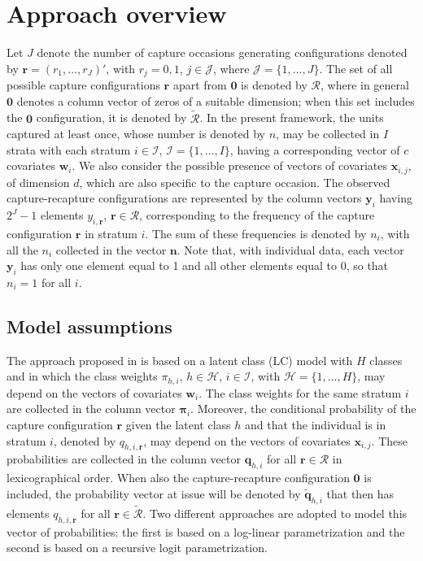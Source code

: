 \section{Approach overview}
%
Let $J$ denote the number of capture occasions generating configurations denoted by $\bm{r}=(r_1,\ldots,r_J)'$, with $r_j=0,1$, $j\in\mathcal{J}$, where $\mathcal{J}=\{1,\ldots,J\}$.
The set of all possible capture configurations $\bm{r}$ apart from $\bm{0}$ is denoted by $\mathcal{R}$, where in general $\bm{0}$ denotes a column vector of zeros of a suitable dimension; when this set includes the $\bm{0}$ configuration, it is denoted by $\tilde{\mathcal{R}}$.
In the present framework, the units captured at least once, whose number is denoted by $n$, may be collected in $I$ strata with each stratum $i\in\mathcal{I}$, $\mathcal{I}=\{1,\ldots,I\}$, having a corresponding vector of $c$ covariates $\bm{w}_i$.
We also consider the possible presence of vectors of covariates $\bm{x}_{i,j}$, of dimension $d$, which are also specific to the capture occasion.
The observed capture-recapture configurations are represented by the column vectors $\bm{y}_i$ having $2^J-1$ elements $y_{i,\bm{r}}$, $\bm{r}\in\mathcal{R}$, corresponding to the frequency of the capture configuration $\bm{r}$ in stratum $i$.
The sum of these frequencies is denoted by $n_i$, with all the $n_i$ collected in the vector $\bm{n}$.
Note that, with individual data, each vector $\bm{y}_i$ has only one element equal to 1 and all other elements equal to 0, so that $n_i=1$ for all $i$.
%
\subsection{Model assumptions}\label{sec:model_assumptions}
%
The approach proposed in \cite{bartolucci2024estimating} is based on a latent class (LC) model with $H$ classes and in which the class weights $\pi_{h,i}$, $h\in\mathcal{H}$, $i\in\mathcal{I}$, with $\mathcal{H}=\{1,\ldots,H\}$, may depend on the vectors of covariates $\bm{w}_i$.
The class weights for the same stratum $i$ are collected in the column vector $\bm\pi_i$.
Moreover, the conditional probability of the capture configuration $\bm{r}$ given the latent class $h$ and that the individual is in stratum $i$, denoted by $q_{h,i,\bm{r}}$, may depend on the vectors of covariates $\bm{x}_{i,j}$.
These probabilities are collected in the column vector $\bm{q}_{h,i}$ for all $\bm{r}\in\mathcal{R}$ in lexicographical order.
When also the capture-recapture configuration $\bm{0}$ is included, the probability vector at issue will be denoted by $\tilde{\bm{q}}_{h,i}$ that then has elements $q_{h,i,\bm{r}}$ for all $\bm{r}\in\tilde{\mathcal{R}}$.
Two different approaches are adopted to model this vector of probabilities: the first is based on a log-linear parametrization and the second is based on a recursive logit parametrization.

